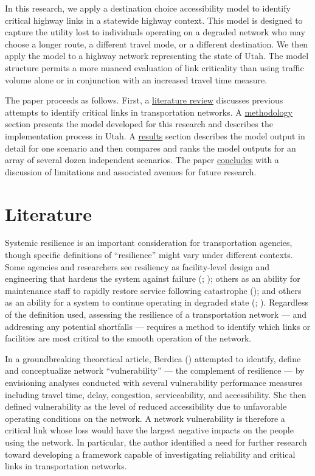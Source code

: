 \documentclass[]{ascelike-new}
\begin{document}
In this research, we apply a destination choice accessibility model to
identify critical highway links in a statewide highway context. This
model is designed to capture the utility lost to individuals operating
on a degraded network who may choose a longer route, a different travel
mode, or a different destination. We then apply the model to a highway
network representing the state of Utah. The model structure permits a
more nuanced evaluation of link criticality than using traffic volume
alone or in conjunction with an increased travel time measure.

The paper proceeds as follows. First, a \hyperref[litreview]{literature
review} discusses previous attempts to identify critical links in
transportation networks. A \hyperref[methodology]{methodology} section
presents the model developed for this research and describes the
implementation process in Utah. A \hyperref[results]{results} section
describes the model output in detail for one scenario and then compares
and ranks the model outputs for an array of several dozen independent
scenarios. The paper \hyperref[conclusion]{concludes} with a discussion
of limitations and associated avenues for future research.


\section{Literature}\label{litreview}

Systemic resilience is an important consideration for transportation
agencies, though specific definitions of ``resilience'' might vary under
different contexts. Some agencies and researchers see resiliency as
facility-level design and engineering that hardens the system against
failure (;
); others as an ability for
maintenance staff to rapidly restore service following catastrophe
(); and others as an
ability for a system to continue operating in degraded state
(; ). Regardless of the definition used, assessing the resilience
of a transportation network --- and addressing any potential shortfalls
--- requires a method to identify which links or facilities are most
critical to the smooth operation of the network.

In a groundbreaking theoretical article, Berdica
() attempted to identify, define and
conceptualize network ``vulnerability'' --- the complement of resilience
--- by envisioning analyses conducted with several vulnerability
performance measures including travel time, delay, congestion,
serviceability, and accessibility. She then defined vulnerability as the
level of reduced accessibility due to unfavorable operating conditions
on the network. A network vulnerability is therefore a critical link
whose loss would have the largest negative impacts on the people using
the network. In particular, the author identified a need for further
research toward developing a framework capable of investigating
reliability and critical links in transportation networks.
\end{document}

